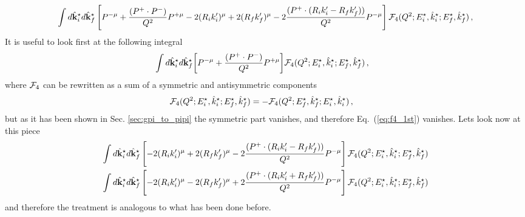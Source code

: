 {\begin{eqnarray}
\int d\hat{{\bf k}}^\star_id\hat{{\bf k}}^\star_f\left[P^{-\mu}+\frac{(P^{+}\cdot P^{-}) }{Q^2}P^{+\mu}-2(R_ik_i^\prime)^\mu+2(R_fk_f^\prime)^\mu-2\frac{(P^{+}\cdot(R_ik_i^\prime-R_fk_f^\prime))}{Q^2} P^{-\mu}\right]{\cal F}_4(Q^2;E_i^\star,{\hat k}_i^\star;E_f^\star,\hat{k}^\star_f)\, ,\label{eq:full_dec_3rd}
\end{eqnarray}
It is useful to look first at the following integral
\begin{eqnarray}
&\int d\hat{{\bf k}}^\star_id\hat{{\bf k}}^\star_f\bigg[P^{-\mu}+\frac{(P^{+}\cdot P^{-}) }{Q^2}P^{+\mu}\bigg]{\cal F}_4(Q^2;E_i^\star,{\hat k}_i^\star;E_f^\star,\hat{k}^\star_f)\, ,\label{eq:f4_1st}
\end{eqnarray}
where ${\cal F}_4$ can   be rewritten as a sum of a symmetric and antisymmetric components
\begin{eqnarray}
&{\cal F}_4(Q^2;E_i^\star,{\hat k}_i^\star;E_f^\star,\hat{k}^\star_f)=-{\cal F}_4(Q^2;E_f^\star,\hat{k}^\star_f;E_i^\star,{\hat k}_i^\star)\, ,
\end{eqnarray}
but as it has been shown in Sec. \ref{sec:gpi_to_pipi} the symmetric part vanishes, and therefore Eq.~(\ref{eq:f4_1st}) vanishes. 
Lets look now at this piece 
\begin{eqnarray}
&\int d\hat{{\bf k}}^\star_id\hat{{\bf k}}^\star_f\left[-2(R_ik_i^\prime)^\mu+2(R_fk_f^\prime)^\mu-2\frac{(P^{+}\cdot(R_ik_i^\prime-R_fk_f^\prime))}{Q^2} P^{-\mu}\right]{\cal F}_4(Q^2;E_i^\star,{\hat k}_i^\star;E_f^\star,\hat{k}^\star_f)\, \label{eq:full_dec_4th}\\
&\int d\hat{{\bf k}}^\star_id\hat{{\bf k}}^\star_f\left[-2(R_ik_i^\prime)^\mu-2(R_fk_f^\prime)^\mu+2\frac{(P^{+}\cdot(R_ik_i^\prime+R_fk_f^\prime))}{Q^2} P^{-\mu}\right]{\cal F}_{4}(Q^2;E_i^\star,{\hat k}_i^\star;E_f^\star,\hat{k}^\star_f)
\end{eqnarray}
and therefore the treatment is analogous to what has been done before.



}
